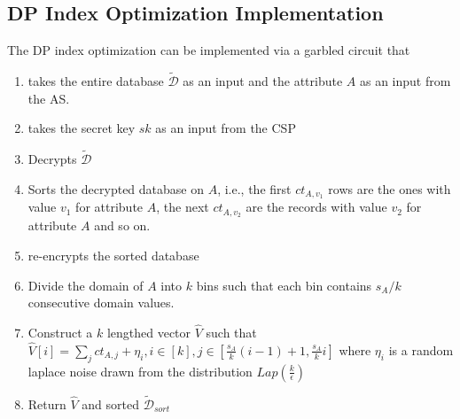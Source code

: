  \subsection{DP Index Optimization Implementation}\label{index-imp}
 The DP index optimization can be implemented via a garbled circuit that \begin{enumerate}\item takes the entire database $\boldsymbol{\mathcal{\tilde{D}}}$ as an input and the attribute $A$ as an input from the \textsf{AS}.
\item takes the secret key $sk$ as an input from  the \textsf{CSP} \item Decrypts $\boldsymbol{\mathcal{\tilde{D}}}$ \item Sorts the decrypted database on $A$, i.e., the first $ct_{A,v_1}$ rows are the ones with value $v_1$ for attribute $A$, the next $ct_{A,v_2}$ are  the records with value $v_2$ for attribute $A$ and so on. \item  re-encrypts the sorted database \item Divide the domain of $A$ into $k$ bins such that each bin contains $s_A/k$ consecutive domain values. \item Construct a $k$ lengthed vector $\hat{V}$ such that $\hat{V}[i]=\sum_jct_{A,j}+\eta_i, i \in [k], j \in [\frac{s_A}{k}(i-1)+1,\frac{s_A}{k}i]$ where $\eta_i$ is a random laplace noise drawn from the distribution $Lap(\frac{k}{\epsilon})$ \item Return $\hat{V}$ and sorted $\boldsymbol{\mathcal{\tilde{D}}}_{sort}$\end{enumerate}